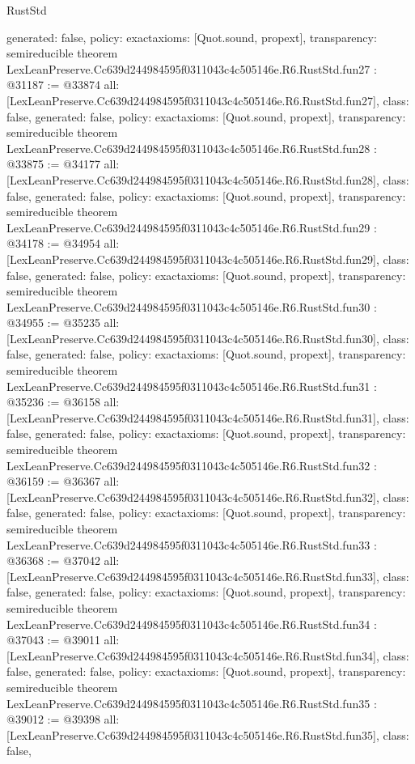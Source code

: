 \begin{lexlean}{RustStd}
\begin{coremodule}
{  generated: false,
  policy: exact{axioms: [Quot.sound, propext]},
  transparency: semireducible
}
theorem LexLeanPreserve.Cc639d244984595f0311043c4c505146e.R6.RustStd.fun27 : @31187 := @33874 {
  all: [LexLeanPreserve.Cc639d244984595f0311043c4c505146e.R6.RustStd.fun27],
  class: false,
  generated: false,
  policy: exact{axioms: [Quot.sound, propext]},
  transparency: semireducible
}
theorem LexLeanPreserve.Cc639d244984595f0311043c4c505146e.R6.RustStd.fun28 : @33875 := @34177 {
  all: [LexLeanPreserve.Cc639d244984595f0311043c4c505146e.R6.RustStd.fun28],
  class: false,
  generated: false,
  policy: exact{axioms: [Quot.sound, propext]},
  transparency: semireducible
}
theorem LexLeanPreserve.Cc639d244984595f0311043c4c505146e.R6.RustStd.fun29 : @34178 := @34954 {
  all: [LexLeanPreserve.Cc639d244984595f0311043c4c505146e.R6.RustStd.fun29],
  class: false,
  generated: false,
  policy: exact{axioms: [Quot.sound, propext]},
  transparency: semireducible
}
theorem LexLeanPreserve.Cc639d244984595f0311043c4c505146e.R6.RustStd.fun30 : @34955 := @35235 {
  all: [LexLeanPreserve.Cc639d244984595f0311043c4c505146e.R6.RustStd.fun30],
  class: false,
  generated: false,
  policy: exact{axioms: [Quot.sound, propext]},
  transparency: semireducible
}
theorem LexLeanPreserve.Cc639d244984595f0311043c4c505146e.R6.RustStd.fun31 : @35236 := @36158 {
  all: [LexLeanPreserve.Cc639d244984595f0311043c4c505146e.R6.RustStd.fun31],
  class: false,
  generated: false,
  policy: exact{axioms: [Quot.sound, propext]},
  transparency: semireducible
}
theorem LexLeanPreserve.Cc639d244984595f0311043c4c505146e.R6.RustStd.fun32 : @36159 := @36367 {
  all: [LexLeanPreserve.Cc639d244984595f0311043c4c505146e.R6.RustStd.fun32],
  class: false,
  generated: false,
  policy: exact{axioms: [Quot.sound, propext]},
  transparency: semireducible
}
theorem LexLeanPreserve.Cc639d244984595f0311043c4c505146e.R6.RustStd.fun33 : @36368 := @37042 {
  all: [LexLeanPreserve.Cc639d244984595f0311043c4c505146e.R6.RustStd.fun33],
  class: false,
  generated: false,
  policy: exact{axioms: [Quot.sound, propext]},
  transparency: semireducible
}
theorem LexLeanPreserve.Cc639d244984595f0311043c4c505146e.R6.RustStd.fun34 : @37043 := @39011 {
  all: [LexLeanPreserve.Cc639d244984595f0311043c4c505146e.R6.RustStd.fun34],
  class: false,
  generated: false,
  policy: exact{axioms: [Quot.sound, propext]},
  transparency: semireducible
}
theorem LexLeanPreserve.Cc639d244984595f0311043c4c505146e.R6.RustStd.fun35 : @39012 := @39398 {
  all: [LexLeanPreserve.Cc639d244984595f0311043c4c505146e.R6.RustStd.fun35],
  class: false,
}
\end{coremodule}
\end{lexlean}

